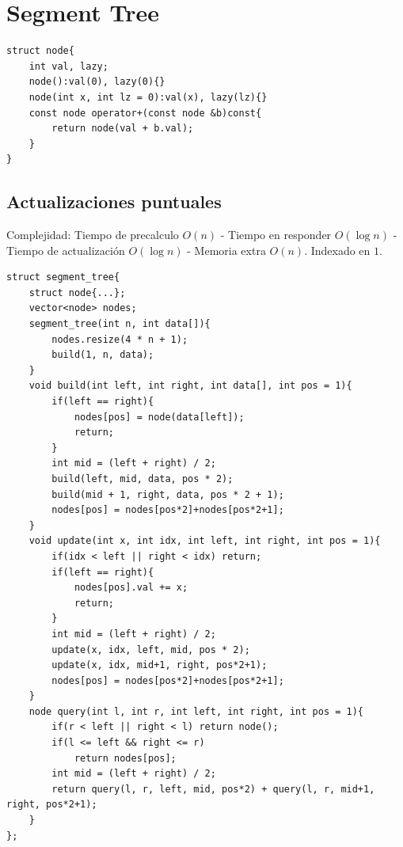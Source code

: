 \section{Segment Tree}
\begin{verbatim}
struct node{
    int val, lazy;
    node():val(0), lazy(0){}
    node(int x, int lz = 0):val(x), lazy(lz){}
    const node operator+(const node &b)const{
        return node(val + b.val);
    }
}
\end{verbatim}



\subsection{Actualizaciones puntuales}
Complejidad: Tiempo de precalculo $O(n)$ - Tiempo en responder $O(\log n)$ - Tiempo de actualización $O(\log n)$ - Memoria extra $O(n)$. Indexado en $1$.
\begin{verbatim}
struct segment_tree{
    struct node{...};
    vector<node> nodes;
    segment_tree(int n, int data[]){
        nodes.resize(4 * n + 1);
        build(1, n, data);
    }
    void build(int left, int right, int data[], int pos = 1){
        if(left == right){
            nodes[pos] = node(data[left]);
            return;
        }
        int mid = (left + right) / 2;
        build(left, mid, data, pos * 2);
        build(mid + 1, right, data, pos * 2 + 1);
        nodes[pos] = nodes[pos*2]+nodes[pos*2+1];
    }
    void update(int x, int idx, int left, int right, int pos = 1){
        if(idx < left || right < idx) return;
        if(left == right){
            nodes[pos].val += x;
            return;
        }
        int mid = (left + right) / 2;
        update(x, idx, left, mid, pos * 2);
        update(x, idx, mid+1, right, pos*2+1);
        nodes[pos] = nodes[pos*2]+nodes[pos*2+1];
    }
    node query(int l, int r, int left, int right, int pos = 1){
        if(r < left || right < l) return node();
        if(l <= left && right <= r)
            return nodes[pos];
        int mid = (left + right) / 2;
        return query(l, r, left, mid, pos*2) + query(l, r, mid+1, right, pos*2+1);
    }
};
\end{verbatim}



